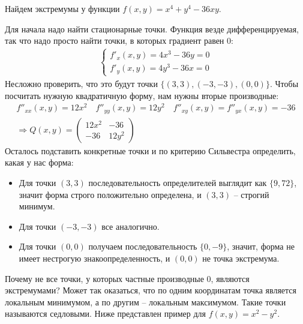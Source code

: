 \begin{example}
    Найдем экстремумы у функции $f(x, y) = x^4 + y^4 - 36xy$.

    Для начала надо найти стационарные точки.
    Функция везде дифференцируемая, так что надо просто найти точки, в которых градиент равен 0: \begin{gather*}
        \begin{cases}
            f'_x(x, y) = 4x^3 - 36y = 0 \\
            f'_y(x, y) = 4y^3 - 36x = 0
        \end{cases}
    \end{gather*}
    Несложно проверить, что это будут точки $\{ (3, 3), (-3, -3), (0, 0) \}$.
    Чтобы посчитать нужную квадратичную форму, нам нужны вторые производные: \begin{gather*} 
        f''_{xx}(x, y) = 12x^2 \quad f''_{yy}(x, y) = 12y^2 \quad f''_{xy}(x, y) = f''_{yx}(x, y) = -36 \\
        \Rightarrow Q(x, y) = \begin{pmatrix}
            12x^2 & -36 \\
            -36 & 12y^2
        \end{pmatrix}
    \end{gather*}
    Осталось подставить конкретные точки и по критерию Сильвестра определить, какая у нас форма: \begin{itemize}
        \item Для точки $(3, 3)$ последовательность определителей выглядит как $\{ 9, 72 \}$, значит форма строго положительно определена, и $(3, 3)$ -- строгий минимум.
        \item Для точки $(-3, -3)$ все аналогично.
        \item Для точки $(0, 0)$ получаем последовательность $\{ 0, -9 \}$, значит, форма не имеет нестрогую знакоопределенность, и $(0, 0)$ не точка экстремума.
    \end{itemize}
\end{example} 

\vspace*{5mm}

Почему не все точки, у которых частные производные 0, являются экстремумами?
Может так оказаться, что по одним координатам точка является локальным минимумом, а по другим -- локальным максимумом.
Такие точки называются седловыми. 
Ниже представлен пример для $f(x, y) = x^2 - y^2$.

\begin{center}
\end{center}